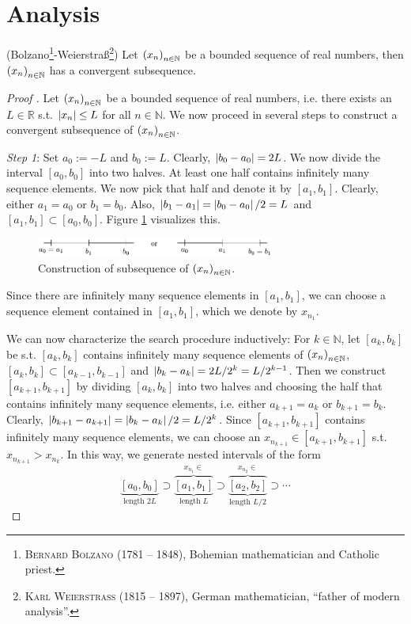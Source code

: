 \section{Analysis}

\begin{theorem}(Bolzano\footnote{\textsc{Bernard Bolzano} (1781 -- 1848), Bohemian mathematician and Catholic priest.}-Weierstraß\footnote{\textsc{Karl Weierstraß} (1815 -- 1897), German mathematician, \enquote{father of modern analysis}.})
	Let $\seq[x_n]$ be a bounded sequence of real numbers, then $\seq[x_n]$ has a convergent subsequence.
\end{theorem}

\begin{proof}[Proof \cite{src:bolzano_weierstrass}]
	Let $\seq[x_n]$ be a bounded sequence of real numbers, i.e. there exists an $L\in\mathbb R$ s.t. $\abs{x_n}\leq L$ for all $n\in\mathbb N$. We now proceed in several steps to construct a convergent subsequence of $\seq[x_n]$.
	
	\textit{Step 1}: Set $a_0 := -L$ and $b_0 := L$. Clearly, $\abs{b_0 - a_0} = 2L$. We now divide the interval $[a_0, b_0]$ into two halves. At least one half contains infinitely many sequence elements. We now pick that half and denote it by $[a_1, b_1]$. Clearly, either $a_1 = a_0$ or $b_1 = b_0$. Also, $\abs{b_1 - a_1} = \abs{b_0 - a_0}/2 = L$ and $[a_1, b_1]\subset [a_0, b_0]$. Figure \ref{fig:bolzano_weierstrass} visualizes this. 
	\begin{figure}[h!]
		\centering
		\includegraphics[width=0.7\textwidth]{Figures/bolzano_weierstrass_interval_construction.pdf}
		\caption{Construction of subsequence of $\seq[x_n]$.}
		\label{fig:bolzano_weierstrass}
	\end{figure}
	Since there are infinitely many sequence elements in $[a_1, b_1]$, we can choose a sequence element contained in $[a_1, b_1]$, which we denote by $x_{n_1}$. 
	
	We can now characterize the search procedure inductively: For $k\in\mathbb N$, let $[a_k, b_k]$ be s.t. $[a_k, b_k]$ contains infinitely many sequence elements of $\seq[x_n]$, $[a_k, b_k]\subset [a_{k-1}, b_{k-1}]$ and $\abs{b_k - a_k} = 2L/2^k = L/2^{k-1}$. Then we construct $[a_{k+1}, b_{k+1}]$ by dividing $[a_k, b_k]$ into two halves and choosing the half that contains infinitely many sequence elements, i.e. either $a_{k+1} = a_k$ or $b_{k + 1} = b_{k}$. Clearly, $\abs{b_{k+1} - a_{k+1}} = \abs{b_k - a_k}/2 = L/2^{k}$. Since $[a_{k+1}, b_{k+1}]$ contains infinitely many sequence elements, we can choose an $x_{n_{k+1}}\in [a_{k+1}, b_{k+1}]$ s.t. $x_{n_{k+1}} > x_{n_k}$. In this way, we generate nested intervals of the form 
	\[
		\underbrace{[a_0, b_0]}_{\text{length } 2L} \supset \overbrace{\underbrace{[a_1, b_1]}}^{x_{n_1}\in}_{\text{length } L} \supset \overbrace{\underbrace{[a_2, b_2]}}^{x_{n_2} \in }_{\text{length }L/2} \supset \cdots		
	\]
	

\end{proof}
